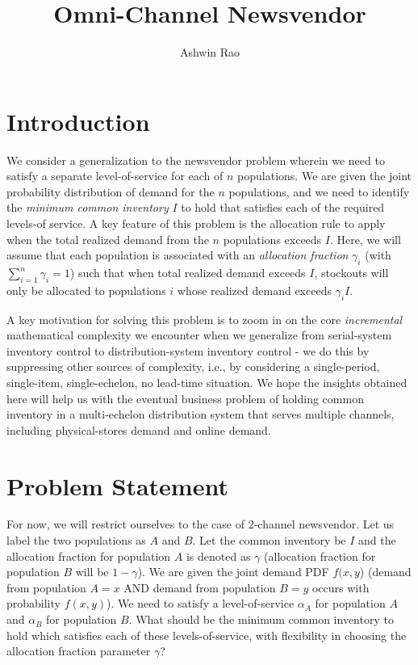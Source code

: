 \documentclass[11pt]{article}   	%
\title{Omni-Channel Newsvendor}
\author{Ashwin Rao}
\date{}							%
\begin{document}
\maketitle

\section{Introduction}

We consider a generalization to the newsvendor problem wherein we need to satisfy a separate level-of-service for each of $n$ populations. We are given the joint probability distribution of demand for the $n$ populations, and we need to identify the {\em minimum common inventory} $I$ to hold that satisfies each of the required levels-of service. A key feature of this problem is the allocation rule to apply when the total realized demand from the $n$ populations exceeds $I$. Here, we will assume that each population is associated with an {\em allocation fraction} $\gamma_i$ (with $\sum_{i=1}^n \gamma_i = 1$) such that when total realized demand exceeds $I$, stockouts will only be allocated to populations $i$ whose realized demand exceeds $\gamma_i I$.

A key motivation for solving this problem is to zoom in on the core {\em incremental} mathematical complexity we encounter when we generalize from serial-system inventory control to distribution-system inventory control - we do this by suppressing other sources of complexity, i.e., by considering a single-period, single-item, single-echelon, no lead-time situation. We hope the insights obtained here will help us with the eventual business problem of holding common inventory in a multi-echelon distribution system that serves multiple channels, including physical-stores demand and online demand.

\section{Problem Statement}

For now, we will restrict ourselves to the case of 2-channel newsvendor. Let us label the two populations as $A$ and $B$. Let the common inventory be $I$ and the allocation fraction for population $A$ is denoted as $\gamma$ (allocation fraction for population $B$ will be $1-\gamma$). We are given the joint demand PDF $f(x,y$) (demand from population $A = x$ AND demand from population $B =  y$ occurs with probability $f(x,y)$). We need to satisfy a level-of-service $\alpha_A$ for population $A$ and $\alpha_B$ for population $B$. What should be the minimum common inventory to hold which satisfies each of these levels-of-service, with flexibility in choosing the allocation fraction parameter $\gamma$? 
\end{document}
